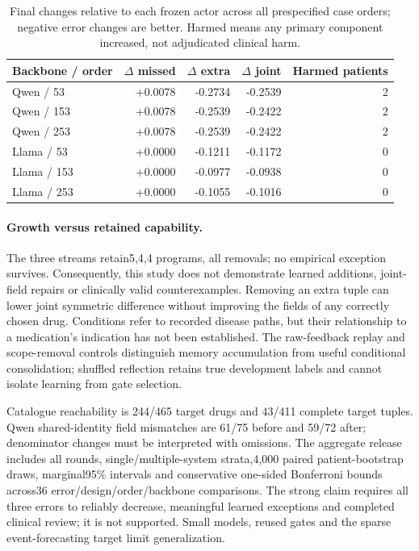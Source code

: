 \begin{table}[t]\centering\small
\caption{Final changes relative to each frozen actor across all prespecified case orders; negative error changes are better. Harmed means any primary component increased, not adjudicated clinical harm.}\label{tab:order-retention}
\begin{tabular}{@{}lrrrr@{}}\toprule
Backbone / order & $\Delta$ missed & $\Delta$ extra & $\Delta$ joint & Harmed patients\\\midrule
Qwen / 53 & +0.0078 & -0.2734 & -0.2539 & 2\\
Qwen / 153 & +0.0078 & -0.2539 & -0.2422 & 2\\
Qwen / 253 & +0.0078 & -0.2539 & -0.2422 & 2\\
Llama / 53 & +0.0000 & -0.1211 & -0.1172 & 0\\
Llama / 153 & +0.0000 & -0.0977 & -0.0938 & 0\\
Llama / 253 & +0.0000 & -0.1055 & -0.1016 & 0\\
\bottomrule\end{tabular}\end{table}

\paragraph{Growth versus retained capability.} The three streams retain5,4,4 programs, all removals; no empirical exception survives. Consequently, this study does not demonstrate learned additions, joint-field repairs or clinically valid counterexamples. Removing an extra tuple can lower joint symmetric difference without improving the fields of any correctly chosen drug. Conditions refer to recorded disease paths, but their relationship to a medication's indication has not been established. The raw-feedback replay and scope-removal controls distinguish memory accumulation from useful conditional consolidation; shuffled reflection retains true development labels and cannot isolate learning from gate selection.

Catalogue reachability is 244/465 target drugs and 43/411 complete target tuples. Qwen shared-identity field mismatches are 61/75 before and 59/72 after; denominator changes must be interpreted with omissions. The aggregate release includes all rounds, single/multiple-system strata,4,000 paired patient-bootstrap draws, marginal95\% intervals and conservative one-sided Bonferroni bounds across36 error/design/order/backbone comparisons. The strong claim requires all three errors to reliably decrease, meaningful learned exceptions and completed clinical review; it is not supported. Small models, reused gates and the sparse event-forecasting target limit generalization.

